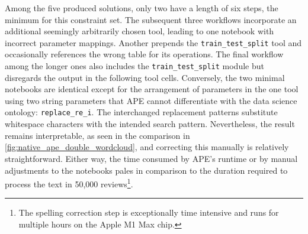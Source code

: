 Among the five produced solutions, only two have a length of six steps, the minimum for this constraint set. The subsequent three workflows incorporate an additional seemingly arbitrarily chosen tool, leading to one notebook with incorrect parameter mappings. Another prepends the \verb|train_test_split| tool and occasionally references the wrong table for its operations. The final workflow among the longer ones also includes the \verb|train_test_split| module but disregards the output in the following tool cells. Conversely, the two minimal notebooks are identical except for the arrangement of parameters in the one tool using two string parameters that APE cannot differentiate with the data science ontology: \verb|replace_re_i|. The interchanged replacement patterns substitute whitespace characters with the intended search pattern. Nevertheless, the result remains interpretable, as seen in the comparison in \autoref{fig:native_ape_double_wordcloud}, and correcting this manually is relatively straightforward. Either way, the time consumed by APE's runtime or by manual adjustments to the notebooks pales in comparison to the duration required to process the text in 50,000 reviews\footnote{The spelling correction step is exceptionally time intensive and runs for multiple hours on the Apple M1 Max chip.}.

